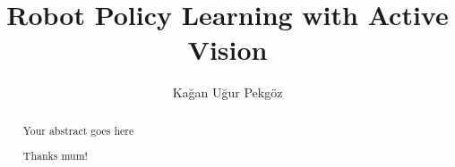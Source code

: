 \documentclass[a4paper, twoside]{report}
\title{Robot Policy Learning with Active Vision}
\author{Kağan Uğur Pekgöz}
\begin{document}


\begin{abstract}
Your abstract goes here
\end{abstract}

\renewcommand{\abstractname}{Acknowledgements}
\begin{abstract}
Thanks mum!
\end{abstract}

\tableofcontents
\listoffigures
\listoftables










\end{document}
